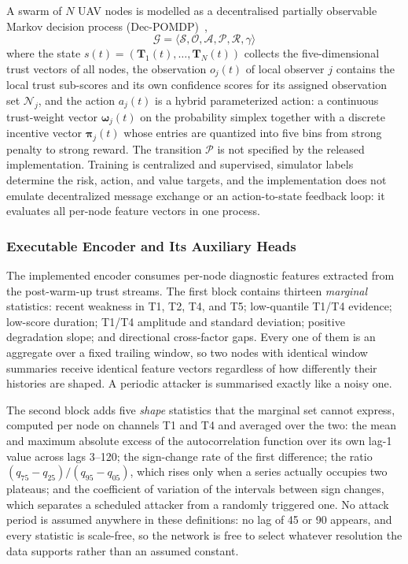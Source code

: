 \documentclass[notspecified,article,submit,moreauthors]{Definitions/mdpi}
\begin{document}
A swarm of $N$ UAV nodes is modelled as a decentralised partially observable Markov decision process (Dec-POMDP)~\cite{oliehoek2008optimal},
\begin{equation}
\mathcal{G} = \langle \mathcal{S}, \mathcal{O}, \mathcal{A}, \mathcal{P}, \mathcal{R}, \gamma \rangle
\end{equation}
where the state $s(t) = (\mathbf{T}_1(t), \dots, \mathbf{T}_N(t))$ collects the five-dimensional trust vectors of all nodes, the observation $o_j(t)$ of local observer $j$ contains the local trust sub-scores and its own confidence scores for its assigned observation set $\mathcal{N}_j$, and the action $a_j(t)$ is a hybrid parameterized action: a continuous trust-weight vector $\boldsymbol{\omega}_j(t)$ on the probability simplex together with a discrete incentive vector $\boldsymbol{\pi}_j(t)$ whose entries are quantized into five bins from strong penalty to strong reward. The transition $\mathcal{P}$ is not specified by the released implementation. Training is centralized and supervised, simulator labels determine the risk, action, and value targets, and the implementation does not emulate decentralized message exchange or an action-to-state feedback loop: it evaluates all per-node feature vectors in one process.

\subsubsection{Executable Encoder and Its Auxiliary Heads}
The implemented encoder consumes per-node diagnostic features extracted from the post-warm-up trust streams. The first block contains thirteen \emph{marginal} statistics: recent weakness in T1, T2, T4, and T5; low-quantile T1/T4 evidence; low-score duration; T1/T4 amplitude and standard deviation; positive degradation slope; and directional cross-factor gaps. Every one of them is an aggregate over a fixed trailing window, so two nodes with identical window summaries receive identical feature vectors regardless of how differently their histories are shaped. A periodic attacker is summarised exactly like a noisy one.

The second block adds five \emph{shape} statistics that the marginal set cannot express, computed per node on channels T1 and T4 and averaged over the two: the mean and maximum absolute excess of the autocorrelation function over its own lag-1 value across lags 3--120; the sign-change rate of the first difference; the ratio $(q_{75}-q_{25})/(q_{95}-q_{05})$, which rises only when a series actually occupies two plateaus; and the coefficient of variation of the intervals between sign changes, which separates a scheduled attacker from a randomly triggered one. No attack period is assumed anywhere in these definitions: no lag of 45 or 90 appears, and every statistic is scale-free, so the network is free to select whatever resolution the data supports rather than an assumed constant.
\end{document}
